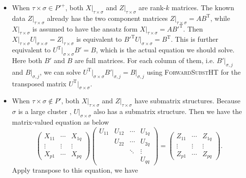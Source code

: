 \documentclass[11pt, a4paper]{book}
\begin{document}
\begin{itemize}
\item When $\tau\times\sigma\in P'^+$, both $X \big\vert_{\tau\times\sigma}$ and
  $Z \big\vert_{\tau\times\sigma}$ are rank-$k$ matrices. The known data
  $Z \big\vert_{\tau\times\sigma}$ already has the two component matrices
  $Z \big\vert_{\tau\times\sigma} = AB^{\mathrm{T}}$, while
  $X \big\vert_{\tau\times\sigma}$ is assumed to have the ansatz form
  $X \big\vert_{\tau\times\sigma} = A B'^{\mathrm{T}}$. Then
  $X \big\vert_{\tau\times\sigma} U \big\vert_{\sigma\times\sigma} = Z
  \big\vert_{\tau\times\sigma}$ is equivalent to
  $B'^{\mathrm{T}} U \big\vert_{\sigma\times\sigma} = B^{\mathrm{T}}$. This is further
  equivalent to $U^{\mathrm{T}} \big\vert_{\sigma\times\sigma} B' = B$, which is the
  actual equation we should solve. Here both $B'$ and $B$ are full matrices. For each
  column of them, i.e. $B' \big\vert_{\sigma,j}$ and $B \big\vert_{\sigma,j}$, we can
  solve
  $U^{\mathrm{T}} \big\vert_{\sigma\times\sigma} B' \big\vert_{\sigma,j} = B
  \big\vert_{\sigma,j}$ using \textsc{ForwardSubstHT} for the transposed matrix
  $U^{\mathrm{T}} \big\vert_{\sigma\times\sigma}$.
\item When $\tau\times\sigma\notin P'$, both $X \big\vert_{\tau\times\sigma}$ and $Z
  \big\vert_{\tau\times\sigma}$ have submatrix structures. Because $\sigma$ is a large
  cluster , $U \big\vert_{\sigma\times\sigma}$ also has a submatrix structure. Then we
  have the matrix-valued equation as below
  \begin{equation}
    \begin{pmatrix}
      X_{11} & \cdots & X_{1q} \\
      \vdots & \vdots & \vdots \\
      X_{p1} & \cdots & X_{pq}
    \end{pmatrix}
    \begin{pmatrix}
      U_{11} & U_{12} & \cdots & U_{1q} \\
      & U_{22} & \cdots & U_{2q} \\
      & & \ddots & \vdots \\
      & & & U_{qq}
    \end{pmatrix} =
    \begin{pmatrix}
      Z_{11} & \cdots & Z_{1q} \\
      \vdots & \vdots & \vdots \\
      Z_{p1} & \cdots & Z_{pq}
    \end{pmatrix}.
  \end{equation}
  Apply transpose to this equation, we have

\end{itemize}
\end{document}
